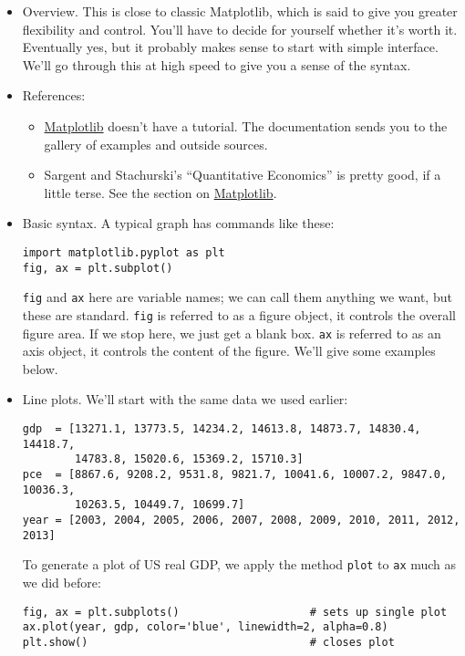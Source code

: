 \documentclass[11pt]{article}
\begin{document}
\begin{itemize}
\item Overview.
This is close to classic Matplotlib,
which is said to give you greater flexibility and control.
You'll have to decide for yourself whether it's worth it.
Eventually yes, but it probably makes sense to start with simple interface.
We'll go through this at high speed to give you a sense
of the syntax.

\item References:
\begin{itemize}
\item \href{http://matplotlib.org/index.html}{Matplotlib}
doesn't have a tutorial.
The documentation sends you to the gallery of examples and outside sources.
\item Sargent and Stachurski's ``Quantitative Economics'' is pretty good, if a little terse.
See the section on
\href{http://quant-econ.net/py/matplotlib.html}{Matplotlib}.
\end{itemize}

\item Basic syntax.  A typical graph has commands like these:
\begin{verbatim}
import matplotlib.pyplot as plt
fig, ax = plt.subplot()
\end{verbatim}
{\tt fig} and {\tt ax} here are variable names;
we can call them anything we want, but these are standard.
{\tt fig} is referred to as a figure object, it controls the overall figure area.
If we stop here, we just get a blank box.
{\tt ax} is referred to as an axis object,
 it controls the content of the figure.
 We'll give some examples below.

\item Line plots.  We'll start with the same data we used earlier:
\begin{verbatim}
gdp  = [13271.1, 13773.5, 14234.2, 14613.8, 14873.7, 14830.4, 14418.7,
        14783.8, 15020.6, 15369.2, 15710.3]
pce  = [8867.6, 9208.2, 9531.8, 9821.7, 10041.6, 10007.2, 9847.0, 10036.3,
        10263.5, 10449.7, 10699.7]
year = [2003, 2004, 2005, 2006, 2007, 2008, 2009, 2010, 2011, 2012, 2013]
\end{verbatim}
To generate a plot of US real GDP, we apply the method {\tt plot}
to {\tt ax} much as we did before:
\begin{verbatim}
fig, ax = plt.subplots()                    # sets up single plot
ax.plot(year, gdp, color='blue', linewidth=2, alpha=0.8)
plt.show()                                  # closes plot
\end{verbatim}


\end{itemize}
\end{document}

